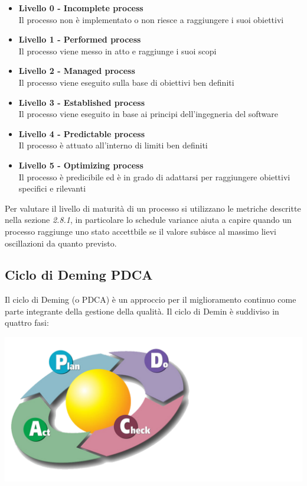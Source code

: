 {\begin{itemize}
  \item \textbf{Livello 0 - Incomplete process}\\
  Il processo non è implementato o non riesce a raggiungere i suoi obiettivi
  \item \textbf{Livello 1 - Performed process}\\
  Il processo viene messo in atto e raggiunge i suoi scopi
  \item  \textbf{Livello 2 - Managed process}\\
  Il processo viene eseguito sulla base di obiettivi ben definiti
  \item  \textbf{Livello 3 - Established process}\\
  Il processo viene eseguito in base ai principi dell’ingegneria del software
  \item  \textbf{Livello 4 - Predictable process}\\
  Il processo è attuato all’interno di limiti ben definiti
  \item  \textbf{Livello 5 - Optimizing process}\\
  Il processo è predicibile ed è in grado di adattarsi per raggiungere obiettivi specifici e rilevanti
\end{itemize}

Per valutare il livello di maturità di un processo si utilizzano le metriche descritte nella sezione \emph{2.8.1}, in particolare lo schedule variance aiuta a capire quando un processo raggiunge uno stato accettbile se il valore subisce al massimo lievi oscillazioni da quanto previsto.





\subsection{Ciclo di Deming PDCA}
Il ciclo di Deming (o PDCA) è un approccio per il miglioramento continuo come parte integrante della gestione della qualità.
Il ciclo di Demin è suddiviso in quattro fasi: \\




\begin{center}
   \includegraphics[scale=0.5]{img/deming.png}
\end{center}



}
